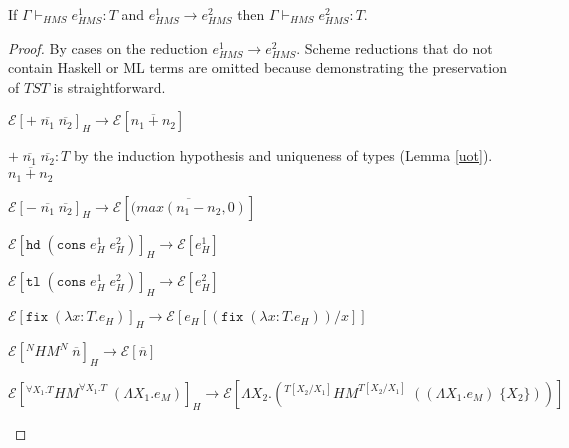 \begin{theorem}
\label{pn}
\onehalfspacing
If $\Gamma\vdash_{HMS}e_{HMS}^{1}:T$ and $e_{HMS}^{1}\rightarrow e_{HMS}^{2}$ then $\Gamma\vdash_{HMS}e_{HMS}^{2}:T$.
\begin{proof}
By cases on the reduction $e_{HMS}^{1}\rightarrow e_{HMS}^{2}$.  Scheme reductions that do not contain Haskell or ML terms are omitted because demonstrating the preservation of $TST$ is straightforward.




%


\begin{case}
$\mathscr{E}[+\;\overline{n_{1}}\;\overline{n_{2}}]_{H}\rightarrow\mathscr{E}[\overline{n_{1}+n_{2}}]$

$+\;\overline{n_{1}}\;\overline{n_{2}}:T$ by the induction hypothesis and uniqueness of types (Lemma \ref{uot}).  $\overline{n_{1}+n_{2}}$
\end{case}
\begin{case}
$\mathscr{E}[-\;\overline{n_{1}}\;\overline{n_{2}}]_{H}\rightarrow\mathscr{E}[\overline{(max(n_{1}-n_{2},0)}]$

\end{case}
\begin{case}
$\mathscr{E}[\mathtt{hd}\;(\mathtt{cons}\;e_{H}^{1}\;e_{H}^{2})]_{H}\rightarrow\mathscr{E}[e_{H}^{1}]$

\end{case}
\begin{case}
$\mathscr{E}[\mathtt{tl}\;(\mathtt{cons}\;e_{H}^{1}\;e_{H}^{2})]_{H}\rightarrow\mathscr{E}[e_{H}^{2}]$

\end{case}
\begin{case}
$\mathscr{E}[\mathtt{fix}\;(\lambda x:T.e_{H})]_{H}\rightarrow\mathscr{E}[e_{H}[(\mathtt{fix}\;(\lambda x:T.e_{H}))/x]]$

\end{case}
\begin{case}
$\mathscr{E}[^{N}HM^{N}\;\overline{n}]_{H}\rightarrow\mathscr{E}[\overline{n}]$

\end{case}
\begin{case}
$\mathscr{E}[^{\forall X_{1}.T}HM^{\forall X_{1}.T}\;(\Lambda X_{1}.e_{M})]_{H}\rightarrow\mathscr{E}[\Lambda X_{2}.(^{T[X_{2}/X_{1}]}HM^{T[X_{2}/X_{1}]}\;((\Lambda X_{1}.e_{M})\;\lbrace X_{2}\rbrace))]$



\end{case}
\end{proof}
\end{theorem}
